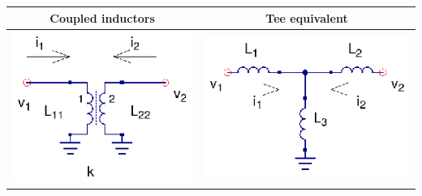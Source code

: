 \begin{table}[H]
  \centering
  \begin{tabular}{ | c | c | }
    \hline
    Coupled inductors & Tee equivalent\\ \hline
    \begin{minipage}{.4\textwidth}
      \includegraphics[width=\linewidth]{./images/Synthesis/Impedance_Matching/coupled-inductors}
    \end{minipage}
    &
    \begin{minipage}{.4\textwidth}
      \includegraphics[width=\linewidth]{./images/Synthesis/Impedance_Matching/coupled-inductors-tee-equivalent}
    \end{minipage}

\end{tabular}
\end{table}
